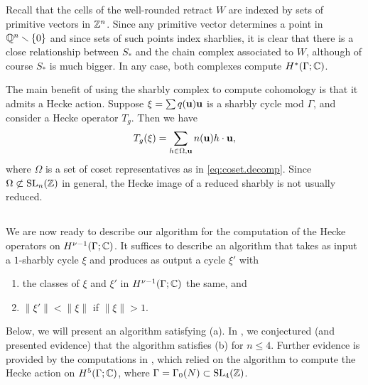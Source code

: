 \subsection{}\label{that.section}
%
Recall that the cells of the well-rounded retract $W$ are indexed by
sets of primitive vectors in $\mathbb{Z}^{n}$.  Since any primitive vector
determines a point in $\mathbb{Q}^{n}\smallsetminus \{0 \}$ and since sets of
such points index sharblies, it is clear that there is a close
relationship between $S_{*}$ and the chain complex associated to $W$,
although of course $S_{*}$ is much bigger.  In any case, both
complexes compute $H^{*} (\Gamma ; \mathbb{C})$.

The main benefit of using the sharbly complex to compute cohomology is
that it admits a Hecke action.  Suppose $\xi = \sum q ({\mathbf {u}} ){\mathbf {u}} $ is a
sharbly cycle mod $\Gamma $, and consider a Hecke operator $T_{g}$.
Then we have
\begin{equation}\label{how.hecke.acts}
T_{g}(\xi ) = \sum _{h\in \Omega , {\mathbf {u}} } n ({\mathbf {u}} )h\cdot {\mathbf {u}}, 
\end{equation}
where $\Omega$ is a set of coset representatives as in
\eqref{eq:coset.decomp}.  
Since $\Omega \not \subset \operatorname{SL} _{n} (\mathbb{Z} )$ in general, the 
Hecke image of a
reduced sharbly is not usually reduced.

\subsection{}
%
We are now ready to describe our algorithm for the computation of the
Hecke operators on $H^{\nu -1} (\Gamma ;\mathbb{C} )$.   It suffices to describe an
algorithm that takes as input a $1$-sharbly cycle $\xi $ and produces
as output a cycle $\xi '$ with
\begin{enumerate}
\item [(a)] the classes of $\xi $ and $\xi '$ in $H^{\nu -1} (\Gamma
;\mathbb{C} )$ the same, and 
\item [(b)] $\|\xi' \| < \|\xi \|$ if $\|\xi \|>1$.
\end{enumerate}

Below, we will present an algorithm satisfying (a).  In
\cite{experimental}, we conjectured (and presented evidence) that the
algorithm satisfies (b) for $n\leq 4$.  Further evidence is provided
by the computations in \cite{computation}, which relied on the
algorithm to compute the Hecke action on $H^{5} (\Gamma ; \mathbb{C})$, where
$\Gamma = \Gamma_{0} (N)\subset \operatorname{SL}_{4} (\mathbb{Z})$.


